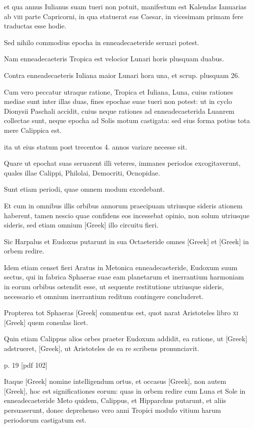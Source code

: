 et qua annus Iulianus
suam tueri non potuit, manifestum est Kalendas Ianuarias ab \textsc{viii}
parte Capricorni, in qua statuerat eas Caesar, in vicesimam primam
fere traductas esse hodie.

Sed nihilo commodius epocha in enneadecaeteride
seruari potest.

Nam enneadecaeteris Tropica est velocior
Lunari horis plusquam duabus.

Contra enneadecaeteris Iuliana
maior Lunari hora una, et scrup. plusquam 26.

Cum vero peccatur
utraque ratione, Tropica et Iuliana, Luna, cuius rationes mediae sunt
inter illas duas, fines epochae suae tueri non potest: ut in cyclo Dionysii
Paschali accidit, cuius neque rationes ad enneadecaeterida Luanrem
collectae sunt, neque epocha ad Solis motum castigata: sed eius
forma potius tota mere Calippica est.

ita ut eius statum post trecentos
4. annos variare necesse sit.

Quare ut epochat suas seruarent illi veteres,
immanes periodos excogitaverunt, quales illae Calippi, Philolai, Democriti,
Ocnopidae.

Sunt etiam periodi, quae omnem modum excedebant.

Et cum in omnibus illis orbibus annorum praecipuam
utriusque sideris ationem haberent, tamen nescio quae confidens eos
incessebat opinio, non solum utriusque sideris, sed etiam omnium
\textgreek{[Greek]} illo circuitu fieri.

Sic Harpalus et Eudoxus putarunt
in sua Octaeteride omnes \textgreek{[Greek]}
 et \textgreek{[Greek]} in orbem redire.

Idem etiam censet fieri Aratus in Metonica enneadecaeteride, Eudoxum
suum sectus, qui in fabrica Sphaerae suae eam planetarum et inerrantium
harmoniam in eorum orbibus ostendit esse, ut sequente
restitutione utriusque sideris, necessario et omnium inerrantium reditum
contingere concluderet.

Propterea tot Sphaeras \textgreek{[Greek]} commentus
est, quot narat Aristoteles libro \textsc{xi} \textgreek{[Greek]} quem
consulas licet.

Quin etiam Calippus alios orbes praeter Eudoxum
addidit, ea ratione, ut \textgreek{[Greek]} adstrueret, \textgreek{[Greek]},
ut Aristoteles de ea re scribens pronunciavit.


p. 19 [pdf 102]

Itaque \textgreek{[Greek]} nomine intelligendum ortus,
 et occasus \textgreek{[Greek]},
non autem \textgreek{[Greek]}, hoc est significationes
eorum: quas in orbem redire cum Luna et Sole in enneadecaeteride
Meto quidem, Calippus, et Hipparchus putarunt, et aliis
persuaserunt, donec deprehenso vero anni Tropici modulo vitium
harum periodorum castigatum est.

